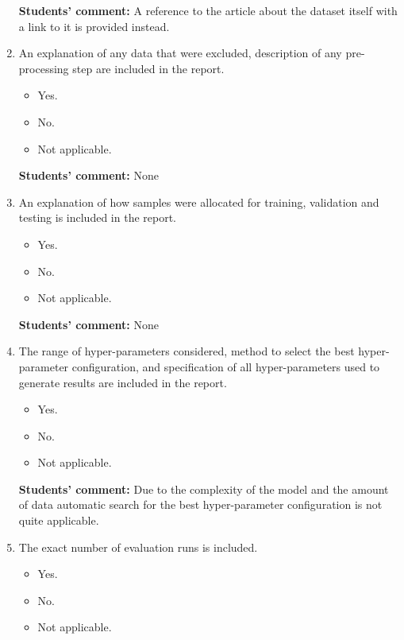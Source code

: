 \documentclass{article}
\begin{document}
\begin{enumerate}
    \textbf{Students' comment:} A reference to the article \cite{DataSet} about the dataset itself with a link to it is provided instead.
    
    \item An explanation of any data that were excluded, description of any pre-processing step are included in the report.
    \begin{itemize}
        \item [\faCheckSquareO] Yes.
        \item [\faSquareO] No.
        \item [\faSquareO] Not applicable.
    \end{itemize}
    
    \textbf{Students' comment:} None
    
    \item An explanation of how samples were allocated for training, validation and testing is included in the report.
    \begin{itemize}
        \item [\faCheckSquareO] Yes.
        \item [\faSquareO] No.
        \item [\faSquareO] Not applicable.
    \end{itemize}
    
    \textbf{Students' comment:} None
    
    \item The range of hyper-parameters considered, method to select the best hyper-parameter
configuration, and specification of all hyper-parameters used to generate results are included in the report.
    \begin{itemize}
        \item [\faCheckSquareO] Yes.
        \item [\faSquareO] No.
        \item [\faSquareO] Not applicable.
    \end{itemize}
    
    \textbf{Students' comment:} Due to the complexity of the model and the 
    amount of data automatic search for the best hyper-parameter configuration 
    is not quite applicable.
    
    \item The exact number of evaluation runs is included.
    \begin{itemize}
        \item [\faSquareO] Yes.
        \item [\faSquareO] No.
        \item [\faCheckSquareO] Not applicable.
    \end{itemize}
    

\end{enumerate}
\end{document}
